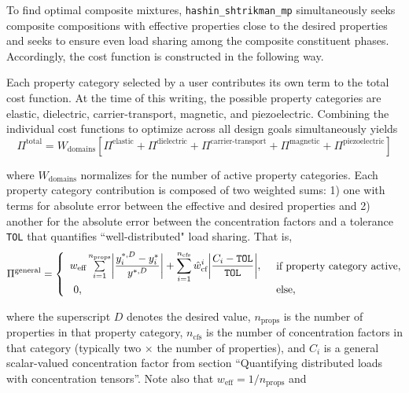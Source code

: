 To find optimal composite mixtures, \texttt{hashin\_shtrikman\_mp}
simultaneously seeks composite compositions with effective properties
close to the desired properties and seeks to ensure even load sharing
among the composite constituent phases. Accordingly, the cost function
is constructed in the following way.

Each property category selected by a user contributes its own term to
the total cost function. At the time of this writing, the possible
property categories are elastic, dielectric, carrier-transport,
magnetic, and piezoelectric. Combining the individual cost functions to
optimize across all design goals simultaneously yields
\begin{equation}\label{eqn:pi}
\Pi^{\text{total}} = W_{\text{domains}}\left[ \Pi^{\text{elastic}} + \Pi^{\text{dielectric}} + \Pi^{\text{carrier-transport}} + \Pi^{\text{magnetic}} + \Pi^{\text{piezoelectric}} \right]
\end{equation}

where \(W_{\text{domains}}\) normalizes for the number of active
property categories. Each property category contribution is composed of
two weighted sums: 1) one with terms for absolute error between the
effective and desired properties and 2) another for the absolute error
between the concentration factors and a tolerance \texttt{TOL} that
quantifies ``well-distributed" load sharing. That is,
\begin{equation}\label{eqn:pi-gen}
\Pi^{\text{general}} =
\begin{cases}
\begin{array}{l}
w_{\text{eff}} \sum\limits_{i=1}^{n_{\text{props}}} \biggl\vert\displaystyle\frac{y_{i}^{*,D} - y_{i}^{*}}{y^{*,D}}\biggr\vert 
+ \sum\limits_{i=1}^{n_{\text{cfs}}} \hat{w}_{\text{cf}}^{i} \biggl\vert\displaystyle\frac{C_{i}-\texttt{TOL}}{\texttt{TOL}}\biggr\vert,
\end{array} & \text{if property category active}, \\
\hspace{3mm} 0, & \text{else},
\end{cases}
\end{equation}

where the superscript \(D\) denotes the desired value,
\(n_{\text{props}}\) is the number of properties in that property
category, \(n_{\text{cfs}}\) is the number of concentration factors in
that category (typically two \(\times\) the number of properties), and
\(C_{i}\) is a general scalar-valued concentration factor from section
``Quantifying distributed loads with concentration tensors''. Note also
that \(w_{\text{eff}} = 1/n_{\text{props}}\) and

